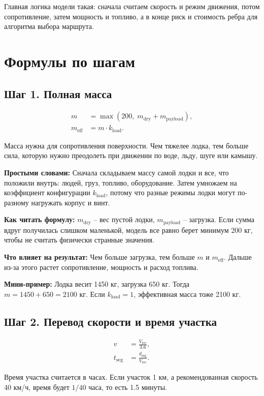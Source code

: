 \documentclass[12pt,a4paper]{article}
\newcommand{\simple}[1]{\par\smallskip\noindent\textbf{Простыми словами:} #1\par}
\newcommand{\howto}[1]{\par\smallskip\noindent\textbf{Как читать формулу:} #1\par}
\newcommand{\effect}[1]{\par\smallskip\noindent\textbf{Что влияет на результат:} #1\par}
\newcommand{\exampletext}[1]{\par\smallskip\noindent\textbf{Мини-пример:} #1\par}
\begin{document}
Главная логика модели такая: сначала считаем скорость и режим движения, потом
сопротивление, затем мощность и топливо, а в конце риск и стоимость ребра для
алгоритма выбора маршрута.

\section{Формулы по шагам}

\subsection{Шаг 1. Полная масса}

\begin{align}
m &= \max\left(200,\; m_{\mathrm{dry}} + m_{\mathrm{payload}}\right), \\
m_{\mathrm{eff}} &= m \cdot k_{\mathrm{load}}.
\end{align}

Масса нужна для сопротивления поверхности. Чем тяжелее лодка, тем больше сила,
которую нужно преодолеть при движении по воде, льду, шуге или камышу.

\simple{Сначала складываем массу самой лодки и все, что положили внутрь:
людей, груз, топливо, оборудование. Затем умножаем на коэффициент конфигурации
\(k_{\mathrm{load}}\), потому что разные режимы лодки могут по-разному
нагружать корпус и винт.}
\howto{\(m_{\mathrm{dry}}\) -- вес пустой лодки, \(m_{\mathrm{payload}}\) --
загрузка. Если сумма вдруг получилась слишком маленькой, модель все равно берет
минимум 200 кг, чтобы не считать физически странные значения.}
\effect{Чем больше загрузка, тем больше \(m\) и \(m_{\mathrm{eff}}\).
Дальше из-за этого растет сопротивление, мощность и расход топлива.}
\exampletext{Лодка весит 1450 кг, загрузка 650 кг. Тогда
\(m=1450+650=2100\) кг. Если \(k_{\mathrm{load}}=1\), эффективная масса тоже
2100 кг.}

\subsection{Шаг 2. Перевод скорости и время участка}

\begin{align}
v &= \frac{V_{\mathrm{rec}}}{3.6}, \\
t_{\mathrm{seg}} &= \frac{d_{\mathrm{seg}}}{V_{\mathrm{rec}}}.
\end{align}

Время участка считается в часах. Если участок 1 км, а рекомендованная скорость
40 км/ч, время будет \(1/40\) часа, то есть 1.5 минуты.
\end{document}
